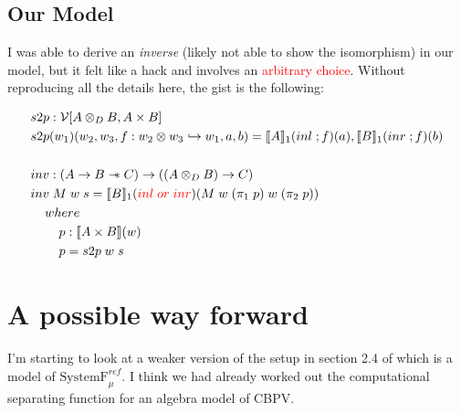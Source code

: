 \documentclass{article}
\newcommand{\den}[1]{\llbracket #1 \rrbracket}
\newcommand{\sep}{\mathrel{-\mkern-6mu*}}
\newcommand{\red}[1]{\textcolor{red}{#1}}
\begin{document}
\subsection{Our Model}
I was able to derive an \textit{inverse} (likely not able to show the isomorphism) in our model, 
but it felt like a hack and involves an \red{arbitrary choice}. Without reproducing all the details here, 
the gist is the following:

\begin{align*}
    &s2p : \mathcal{V}[ A \otimes_D B , A \times B]    \\
    &s2p (w_1)(w_2,w_3,f : w_2 \otimes w_3 \hookrightarrow w_1, a , b) = \den{A}_1(inl\; ; f )(a) , \den{B}_1(inr \; ; f)(b)\\
    \\
    &inv :(A \rightarrow B \sep C ) \rightarrow ((A \otimes_D B) \rightarrow C)\\
    &inv \; M \; w \; s = \den{B}_1(\red{inl \; or \; inr})(M \; w \; (\pi_1 \; p)\; w \; (\pi_2 \;p)) \\ 
    & \;\;\;\; where \\
    & \;\;\;\;\;\;\;\; p : \den{A \times B}(w)\\
    & \;\;\;\;\;\;\;\; p = s2p \; w \; s
\end{align*}

\section{A possible way forward}
I'm starting to look at a weaker version of the setup in section 2.4 of \cite{sterling_denotational_2023} 
which is a model of $\textrm{SystemF}_{\mu}^{ref}$. I think we had already worked out the 
computational separating function for an algebra model of CBPV. 



\end{document}
